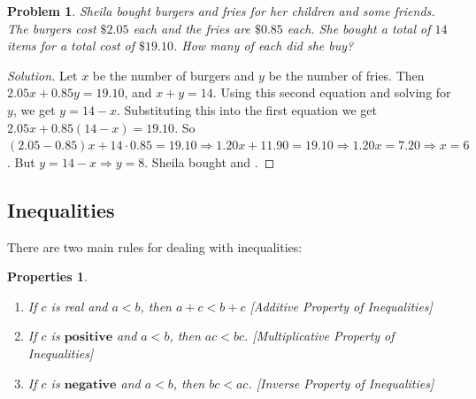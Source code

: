 \documentclass[oneside]{book}
\theoremstyle{mystyle}
\newtheorem{problem}{Problem}[section]
\newtheorem{properties}{Properties}[section]
\begin{document}
\begin{problem}
Sheila bought burgers and fries for her children and some friends. The burgers cost $\$2.05$ each and the fries are $\$0.85$ each. She bought a total of $14$ items for a total cost of $\$19.10$. How many of each did she buy?
\end{problem}
\begin{proof}[Solution]
Let $x$ be the number of burgers and $y$ be the number of fries. Then $2.05x + 0.85y = 19.10$, and $x+y = 14$. Using this second equation and solving for $y$, we get $y = 14 - x$. Substituting this into the first equation we get $2.05x + 0.85(14-x) = 19.10$. So $(2.05 - 0.85)x + 14\cdot 0.85 = 19.10 \Rightarrow 1.20x + 11.90 = 19.10\Rightarrow 1.20x = 7.20 \Rightarrow \boxed{x = 6}$. But $y = 14 - x \Rightarrow \boxed{y = 8}$. Sheila bought  and .
\end{proof}
\subsection{Inequalities}
There are two main rules for dealing with inequalities:
\begin{properties}\label{property:north_shore_properties_of_inequalities}
\
\begin{enumerate}[itemsep=0pt]
    \item \label{property:north_shore_additive_property_inequals}If $c$ is real and $a<b$, then $a+c<b+c$ \hfill [Additive Property of Inequalities]
    \item \label{property:north_shore_multiplicative_property_inequals}If $c$ is $\mathbf{positive}$ and $a<b$, then $ac < bc$. \hfill [Multiplicative Property of Inequalities]
    \item \label{property:north_shore_inverse_property_inequals}If $c$ is $\mathbf{negative}$ and $a<b$, then $bc < ac$. \hfill [Inverse Property of Inequalities]
\end{enumerate}
\end{properties}
\end{document}
